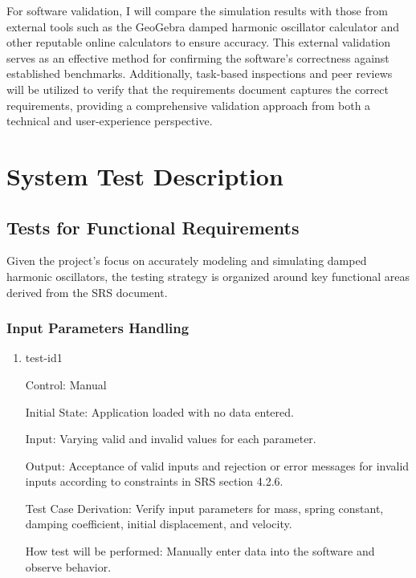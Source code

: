 \documentclass[12pt, titlepage]{article}
\begin{document}
For software validation, I will compare the simulation results with those from external 
tools such as the GeoGebra damped harmonic oscillator calculator and other reputable 
online calculators to ensure accuracy. This external validation serves as an effective 
method for confirming the software's correctness against established benchmarks. 
Additionally, task-based inspections and peer reviews will be utilized to verify that 
the requirements document captures the correct requirements, providing a comprehensive 
validation approach from both a technical and user-experience perspective.

\section{System Test Description}
	
\subsection{Tests for Functional Requirements}

Given the project's focus on accurately modeling and simulating damped harmonic 
oscillators, the testing strategy is organized around key functional areas derived from 
the SRS document.

\subsubsection{Input Parameters Handling}

\begin{enumerate}

\item{test-id1\\}

Control: Manual
					
Initial State: Application loaded with no data entered.
					
Input: Varying valid and invalid values for each parameter.
					
Output: Acceptance of valid inputs and rejection or error messages for invalid inputs 
according to constraints in SRS section 4.2.6.

Test Case Derivation: Verify input parameters for mass, spring constant, damping 
coefficient, initial displacement, and velocity.
					
How test will be performed: Manually enter data into the software and observe behavior.

\end{enumerate}
\end{document}

